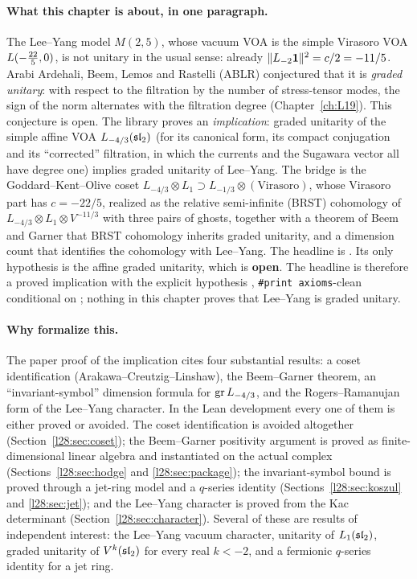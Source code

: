 \paragraph{What this chapter is about, in one paragraph.} The Lee--Yang model $M(2,5)$, whose vacuum VOA is the
simple Virasoro VOA $L(-\tfrac{22}{5},0)$, is not unitary in the usual sense: already $\|L_{-2}\mathbf 1\|^2=c/2=-11/5$.
Arabi Ardehali, Beem, Lemos and Rastelli (ABLR) conjectured that it is \emph{graded unitary}: with respect to the
filtration by the number of stress-tensor modes, the sign of the norm alternates with the filtration degree
(Chapter~\ref{ch:L19}). This conjecture is open. The library proves an \emph{implication}: graded unitarity of the
simple affine VOA $L_{-4/3}(\mathfrak{sl}_2)$ (for its canonical form, its compact conjugation and its ``corrected''
filtration, in which the currents and the Sugawara vector all have degree one) implies graded unitarity of
Lee--Yang. The bridge is the Goddard--Kent--Olive coset $L_{-4/3}\otimes L_1\supset L_{-1/3}\otimes(\text{Virasoro})$,
whose Virasoro part has $c=-22/5$, realized as the relative semi-infinite (BRST) cohomology of
$L_{-4/3}\otimes L_1\otimes V^{-11/3}$ with three pairs of ghosts, together with a theorem of Beem and Garner
that BRST cohomology inherits graded unitarity, and a dimension count that identifies the cohomology with
Lee--Yang. The headline is . Its only hypothesis is the
affine graded unitarity, which is \textbf{open}. The headline is therefore a proved implication with the explicit hypothesis
, \texttt{\#print axioms}-clean conditional on ; nothing in this chapter proves that Lee--Yang is graded unitary.

\paragraph{Why formalize this.} The paper proof of the implication cites four substantial results: a coset
identification (Arakawa--Creutzig--Linshaw), the Beem--Garner theorem, an ``invariant-symbol'' dimension formula
for $\operatorname{gr} L_{-4/3}$, and the Rogers--Ramanujan form of the Lee--Yang character. In the Lean development
every one of them is either proved or avoided. The coset identification is avoided altogether
(Section~\ref{l28:sec:coset}); the Beem--Garner positivity argument is proved as finite-dimensional linear algebra
and instantiated on the actual complex (Sections~\ref{l28:sec:hodge} and \ref{l28:sec:package}); the
invariant-symbol bound is proved through a jet-ring model and a $q$-series identity
(Sections~\ref{l28:sec:koszul} and \ref{l28:sec:jet}); and the Lee--Yang character is proved from the Kac
determinant (Section~\ref{l28:sec:character}). Several of these are results of independent interest: the Lee--Yang
vacuum character, unitarity of $L_1(\mathfrak{sl}_2)$, graded unitarity of $V^k(\mathfrak{sl}_2)$ for every real
$k<-2$, and a fermionic $q$-series identity for a jet ring.

